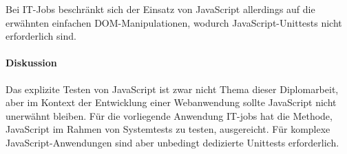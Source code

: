 Bei IT-Jobs beschränkt sich der Einsatz von JavaScript allerdings auf die erwähnten einfachen DOM-Manipulationen, wodurch JavaScript-Unittests nicht erforderlich sind.


\paragraph{Diskussion} Das explizite Testen von JavaScript ist zwar nicht Thema dieser Diplomarbeit, aber im Kontext der Entwicklung einer Webanwendung sollte JavaScript nicht unerwähnt bleiben. Für die vorliegende Anwendung IT-jobs hat die Methode, JavaScript im Rahmen von Systemtests zu testen, ausgereicht. Für komplexe JavaScript-Anwendungen sind aber unbedingt dedizierte Unittests erforderlich.
